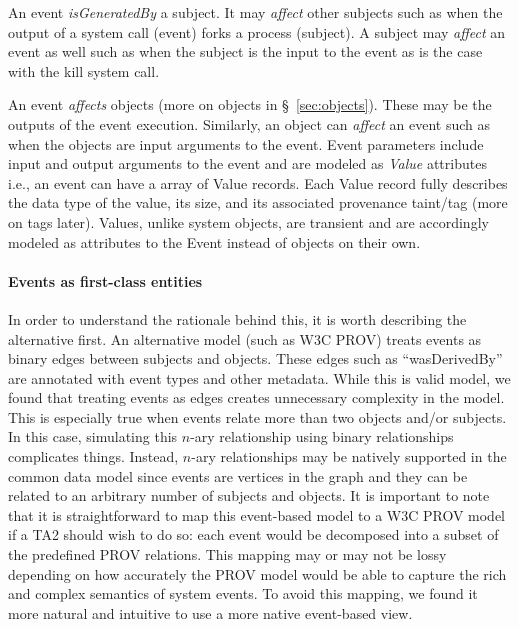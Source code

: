 \documentclass[10pt, conference, onecolumn]{IEEEtran}
\begin{document}
An event \textit{isGeneratedBy} a subject. It may \textit{affect} other subjects such as when the output of a system call (event) forks a process (subject). A subject may \textit{affect} an event as well such as when the subject is the input to the event as is the case with the kill system call. 

An event \textit{affects} objects (more on objects in \S~\ref{sec:objects}). These may be the outputs of the event execution. Similarly, an object can \textit{affect} an event such as when the objects are input arguments to the event. Event parameters include input and output arguments to the event and are modeled as \textit{Value} attributes i.e., an event can have a array of Value records. Each Value record fully describes the data type of the value, its size, and its associated provenance taint/tag (more on tags later). Values, unlike system objects, are transient and are accordingly modeled as attributes to the Event instead of objects on their own. 

\paragraph{Events as first-class entities} In order to understand the rationale behind this, it is worth describing the alternative first. An alternative model (such as W3C PROV) treats events as binary edges between subjects and objects. These edges such as ``wasDerivedBy'' are annotated with event types and other metadata. While this is valid model, we found that treating events as edges creates unnecessary complexity in the model. This is especially true when events relate more than two objects and/or subjects. In this case, simulating this $n$-ary relationship using binary relationships complicates things. 
Instead, $n$-ary relationships may be natively supported in the common data model since events are vertices in the graph and they can be related to an arbitrary number of subjects and objects. 
It is important to note that it is straightforward to map this event-based model to a W3C PROV model if a TA2 should wish to do so: each event would be decomposed into a subset of the predefined PROV relations. This mapping may or may not be lossy depending on how accurately the PROV model would be able to capture the rich and complex semantics of system events. 
To avoid this mapping, we found it more natural and intuitive to use a more native event-based view.
\end{document}
